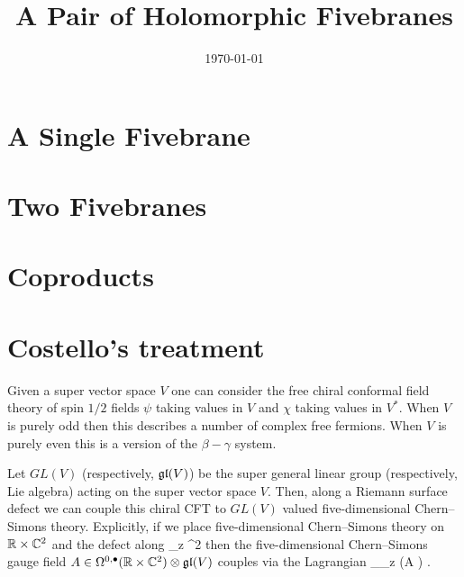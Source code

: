 \documentclass{amsart}
\begin{document}
\title{A Pair of Holomorphic Fivebranes}


\date{\today}
\maketitle


\section{A Single Fivebrane}




\section{Two Fivebranes}




\section{Coproducts}

\appendix

\section{Costello's treatment}

Given a super vector space $V$ one can consider the free chiral conformal field theory of spin $1/2$ fields $\psi$ taking values in $V$ and $\chi$ taking values in $V^*$.
When $V$ is purely odd then this describes a number of complex free fermions.
When $V$ is purely even this is a version of the $\beta-\gamma$ system.

Let $GL(V)$ (respectively, $\mathfrak{gl}(V)$) be the super general linear group (respectively, Lie algebra) acting on the super vector space $V$.
Then, along a Riemann surface defect we can couple this chiral CFT to $GL(V)$ valued five-dimensional Chern--Simons theory. 
Explicitly, if we place five-dimensional Chern--Simons theory on $\mathbb{R} \times \mathbb{C}^2$ and the defect along
 \times \C_z  \subset \R \times \C^2
\eeqn
then the five-dimensional Chern--Simons gauge field $A \in \Omega^{0,\bullet}(\mathbb{R} \times \mathbb{C}^2) \otimes \mathfrak{gl}(V)$ couples via the Lagrangian
\beqn
\int_{\C_z} \chi (A \cdot \psi) .
\eeqn
\end{document}
